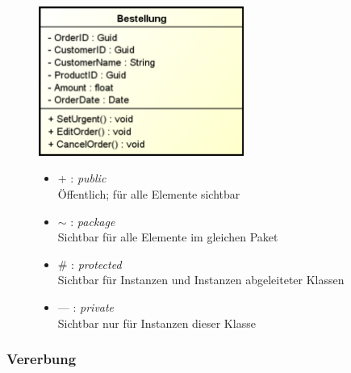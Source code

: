 \documentclass[11pt, a4paper]{article}
\begin{document}
\begin{figure}[ht]
    \centering
    \begin{minipage}[h]{0.45\textwidth}
        \centering \includegraphics[width=0.6\textwidth]{Klassen-00.png}
    \end{minipage}
    \centering
    \begin{minipage}[h]{0.45\textwidth}
        \raggedright \small
        \begin{itemize}
            \item + : \textit{public} \\ Öffentlich; für alle Elemente sichtbar
            \item $\sim$ : \textit{package} \\ Sichtbar für alle Elemente im gleichen Paket
            \item \# : \textit{protected} \\ Sichtbar für Instanzen und Instanzen abgeleiteter Klassen
            \item --- : \textit{private} \\ Sichtbar nur für Instanzen dieser Klasse
        \end{itemize}
    \end{minipage}
\end{figure}


\raggedright \subsubsection{Vererbung}

\vspace{1em}
\end{document}
